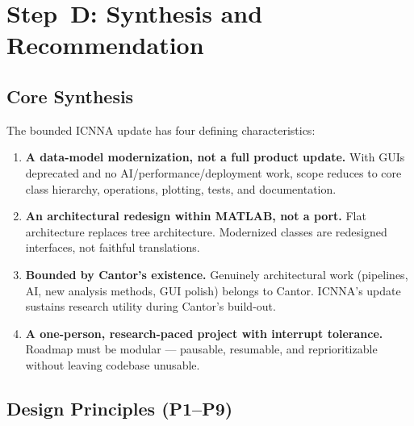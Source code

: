 \documentclass[11pt,a4paper]{article}
\begin{document}
\section{Step~D: Synthesis and Recommendation}

\subsection{Core Synthesis}

The bounded ICNNA update has four defining characteristics:
\begin{enumerate}
    \item \textbf{A data-model modernization, not a full product update.} With GUIs deprecated and no AI/performance/deployment work, scope reduces to core class hierarchy, operations, plotting, tests, and documentation.
    \item \textbf{An architectural redesign within MATLAB, not a port.} Flat architecture replaces tree architecture. Modernized classes are redesigned interfaces, not faithful translations.
    \item \textbf{Bounded by Cantor's existence.} Genuinely architectural work (pipelines, AI, new analysis methods, GUI polish) belongs to Cantor. ICNNA's update sustains research utility during Cantor's build-out.
    \item \textbf{A one-person, research-paced project with interrupt tolerance.} Roadmap must be modular --- pausable, resumable, and reprioritizable without leaving codebase unusable.
\end{enumerate}

\subsection{Design Principles (P1--P9)}
\end{document}
